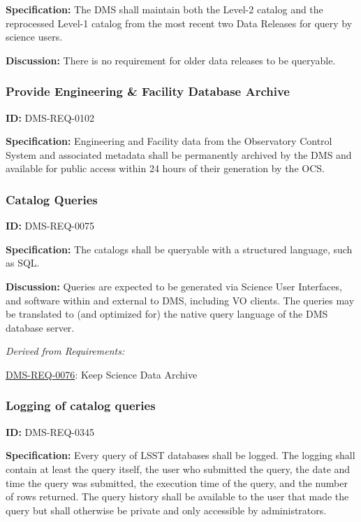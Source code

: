 \documentclass[SE,toc,lsstdraft]{lsstdoc}
\begin{document}
\textbf{Specification:} The DMS shall maintain both the Level-2 catalog and the reprocessed Level-1 catalog from the most recent two Data Releases for query by science users.

\textbf{Discussion: }There is no requirement for older data releases to be queryable.




\subsubsection{Provide Engineering \& Facility Database Archive}

\label{DMS-REQ-0102}
\textbf{ID:} DMS-REQ-0102

\textbf{Specification:} Engineering and Facility data from the Observatory Control System and associated metadata shall be permanently archived by the DMS and available for public access within 24 hours of their generation by the OCS.






\subsubsection{Catalog Queries}

\label{DMS-REQ-0075}
\textbf{ID:} DMS-REQ-0075

\textbf{Specification:} The catalogs shall be queryable with a structured language, such as SQL.

\textbf{Discussion:} Queries are expected to be generated via Science User Interfaces, and software within and external to DMS, including VO clients. The queries may be translated to (and optimized for) the native query language of the DMS database server.




\emph{Derived from Requirements:}

\hyperref[DMS-REQ-0076]{DMS-REQ-0076}:
Keep Science Data Archive \newline


\subsubsection{Logging of catalog queries}

\label{DMS-REQ-0345}
\textbf{ID:} DMS-REQ-0345

    \textbf{Specification: }Every query of LSST databases shall be logged. The logging shall contain at least the query itself, the user who submitted the query, the date and time the query was submitted, the execution time of the query, and the number of rows returned. The query history shall be available to the user that made the query but shall otherwise be private and only accessible by administrators.
\end{document}
